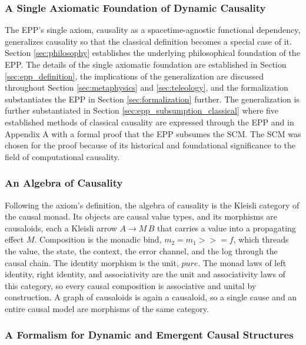 \subsubsection{A Single Axiomatic Foundation of Dynamic Causality}

The EPP's single axiom, causality as a spacetime-agnostic functional dependency, generalizes causality so that the classical
definition becomes a special case of it. Section \ref{sec:philosophy} establishes the underlying philosophical foundation
of the EPP. The details of the single axiomatic foundation are established in Section \ref{sec:epp_definition},
the implications of the generalization are discussed throughout Section \ref{sec:metaphysics} and \ref{sec:teleology},
and the formalization substantiates the EPP in Section \ref{sec:formalization} further.
The generalization is further substantiated in Section \ref{sec:epp_subsumption_classical}
where five established methods of classical causality are expressed through the EPP and in Appendix A with a formal proof
that the EPP subsumes the SCM. The SCM was chosen for the proof because of its historical
and foundational significance to the field of computational causality.


\subsubsection{An Algebra of Causality}

Following the axiom's definition, the algebra of causality is the Kleisli category of the causal monad.
Its objects are causal value types, and its morphisms are causaloids, each a
Kleisli arrow $A \to M\,B$ that carries a value into a propagating effect $M$. Composition
is the monadic bind, $m_2 = m_1 \mathbin{>\!\!>\!\!=} f$, which threads the value, the
state, the context, the error channel, and the log through the causal chain. The identity morphism is the unit, $\mathit{pure}$. The monad laws of left identity,
right identity, and associativity are the unit and associativity laws of this category, so
every causal composition is associative and unital by construction. A graph of causaloids
is again a causaloid, so a single cause and an entire causal model are morphisms of the same category.


\subsubsection{A Formalism for Dynamic and Emergent Causal Structures}

